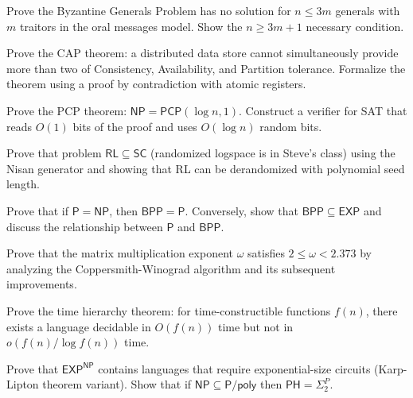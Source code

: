 \documentclass[12pt,a4paper]{exam}
\begin{document}
\begin{questions}

\question[6]
Prove the Byzantine Generals Problem has no solution for $n \leq 3m$ generals with $m$ traitors in the oral messages model. Show the $n \geq 3m+1$ necessary condition.

\vspace{0.3cm}

\question[3]
Prove the CAP theorem: a distributed data store cannot simultaneously provide more than two of Consistency, Availability, and Partition tolerance. Formalize the theorem using a proof by contradiction with atomic registers.

\vspace{0.3cm}

\question[3]
Prove the PCP theorem: $\mathsf{NP} = \mathsf{PCP}(\log n, 1)$. Construct a verifier for SAT that reads $O(1)$ bits of the proof and uses $O(\log n)$ random bits.

\vspace{0.3cm}

\question[3]
Prove that problem $\mathsf{RL} \subseteq \mathsf{SC}$ (randomized logspace is in Steve's class) using the Nisan generator and showing that RL can be derandomized with polynomial seed length.

\vspace{0.3cm}

\question[5]
Prove that if $\mathsf{P} = \mathsf{NP}$, then $\mathsf{BPP} = \mathsf{P}$. Conversely, show that $\mathsf{BPP} \subseteq \mathsf{EXP}$ and discuss the relationship between $\mathsf{P}$ and $\mathsf{BPP}$.

\vspace{0.3cm}

\question[3]
Prove that the matrix multiplication exponent $\omega$ satisfies $2 \leq \omega < 2.373$ by analyzing the Coppersmith-Winograd algorithm and its subsequent improvements.

\vspace{0.3cm}

\question[4]
Prove the time hierarchy theorem: for time-constructible functions $f(n)$, there exists a language decidable in $O(f(n))$ time but not in $o(f(n)/\log f(n))$ time.

\vspace{0.3cm}

\question[5]
Prove that $\mathsf{EXP}^{\mathsf{NP}}$ contains languages that require exponential-size circuits (Karp-Lipton theorem variant). Show that if $\mathsf{NP} \subseteq \mathsf{P}/\mathsf{poly}$ then $\mathsf{PH} = \Sigma_2^P$.


\end{questions}
\end{document}

